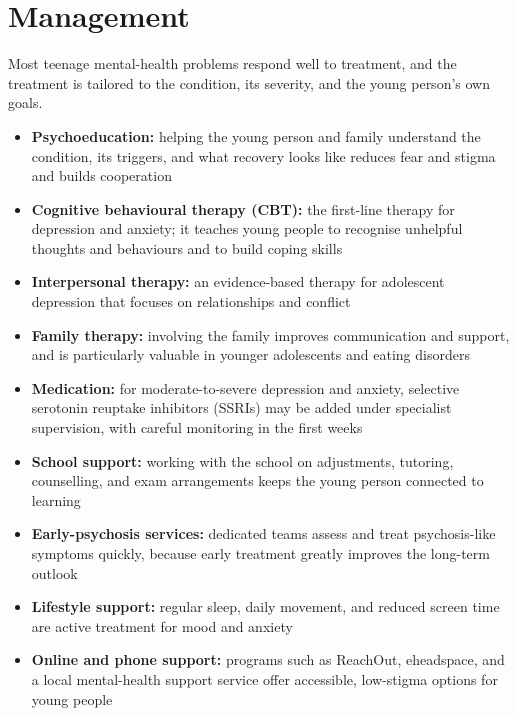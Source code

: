 \section*{Management}
Most teenage mental-health problems respond well to treatment, and the treatment is tailored to the condition, its severity, and the young person's own goals.

\begin{itemize}
    \item \textbf{Psychoeducation:} helping the young person and family understand the condition, its triggers, and what recovery looks like reduces fear and stigma and builds cooperation
    \item \textbf{Cognitive behavioural therapy (CBT):} the first-line therapy for depression and anxiety; it teaches young people to recognise unhelpful thoughts and behaviours and to build coping skills
    \item \textbf{Interpersonal therapy:} an evidence-based therapy for adolescent depression that focuses on relationships and conflict
    \item \textbf{Family therapy:} involving the family improves communication and support, and is particularly valuable in younger adolescents and eating disorders
    \item \textbf{Medication:} for moderate-to-severe depression and anxiety, selective serotonin reuptake inhibitors (SSRIs) may be added under specialist supervision, with careful monitoring in the first weeks
    \item \textbf{School support:} working with the school on adjustments, tutoring, counselling, and exam arrangements keeps the young person connected to learning
    \item \textbf{Early-psychosis services:} dedicated teams assess and treat psychosis-like symptoms quickly, because early treatment greatly improves the long-term outlook
    \item \textbf{Lifestyle support:} regular sleep, daily movement, and reduced screen time are active treatment for mood and anxiety
    \item \textbf{Online and phone support:} programs such as ReachOut, eheadspace, and a local mental-health support service offer accessible, low-stigma options for young people
\end{itemize}

